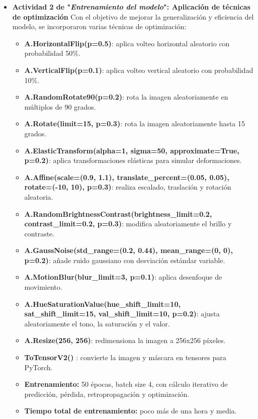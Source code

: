 \begin{enumerate}
\begin{itemize}
  \item\textbf{Actividad 2 de "\textit{Entrenamiento del modelo}": Aplicación de técnicas de optimización}
  Con el objetivo de mejorar la generalización y eficiencia del modelo, se incorporaron varias técnicas de optimización:

\begin{itemize}
  \item \textbf{A.HorizontalFlip(p=0.5)}: aplica volteo horizontal aleatorio con probabilidad 50\%.
  \item \textbf{A.VerticalFlip(p=0.1)}: aplica volteo vertical aleatorio con probabilidad 10\%.
  \item \textbf{A.RandomRotate90(p=0.2)}: rota la imagen aleatoriamente en múltiplos de 90 grados.
  \item \textbf{A.Rotate(limit=15, p=0.3)}: rota la imagen aleatoriamente hasta 15 grados.
  \item \textbf{A.ElasticTransform(alpha=1, sigma=50, approximate=True, p=0.2)}: aplica transformaciones elásticas para simular deformaciones.
  \item \textbf{A.Affine(scale=(0.9, 1.1), translate\_percent=(0.05, 0.05), rotate=(-10, 10), p=0.3)}: realiza escalado, traslación y rotación aleatoria.
  \item \textbf{A.RandomBrightnessContrast(brightness\_limit=0.2, contrast\_limit=0.2, p=0.3)}: modifica aleatoriamente el brillo y contraste.
  \item \textbf{A.GaussNoise(std\_range=(0.2, 0.44), mean\_range=(0, 0), p=0.2)}: añade ruido gaussiano con desviación estándar variable.
  \item \textbf{A.MotionBlur(blur\_limit=3, p=0.1)}: aplica desenfoque de movimiento.
  \item \textbf{A.HueSaturationValue(hue\_shift\_limit=10, sat\_shift\_limit=15, val\_shift\_limit=10, p=0.2)}: ajusta aleatoriamente el tono, la saturación y el valor.
  \item \textbf{A.Resize(256, 256)}: redimensiona la imagen a 256x256 píxeles.
  \item \textbf{ToTensorV2()} : convierte la imagen y máscara en tensores para PyTorch.
  \item \textbf{Entrenamiento:} 50 épocas, batch size 4, con cálculo iterativo de predicción, pérdida, retropropagación y optimización.
  \item \textbf{Tiempo total de entrenamiento:} poco más de una hora y media.
\end{itemize}



\end{itemize}
\end{enumerate}
